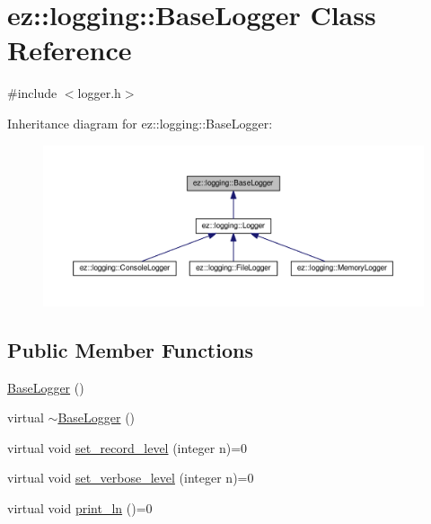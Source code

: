 \hypertarget{classez_1_1logging_1_1BaseLogger}{}\section{ez\+:\+:logging\+:\+:Base\+Logger Class Reference}
\label{classez_1_1logging_1_1BaseLogger}


{\ttfamily \#include $<$logger.\+h$>$}



Inheritance diagram for ez\+:\+:logging\+:\+:Base\+Logger\+:
\nopagebreak
\begin{figure}[H]
\begin{center}
\leavevmode
\includegraphics[width=350pt]{classez_1_1logging_1_1BaseLogger__inherit__graph}
\end{center}
\end{figure}
\subsection*{Public Member Functions}
\begin{DoxyCompactItemize}
\item 
\hyperlink{classez_1_1logging_1_1BaseLogger_ac0f5809baaacc153b6b51eb1a028127b}{Base\+Logger} ()
\item 
virtual \hyperlink{classez_1_1logging_1_1BaseLogger_a8f3ff996b9cd518dc53760ece4083813}{$\sim$\+Base\+Logger} ()
\item 
virtual void \hyperlink{classez_1_1logging_1_1BaseLogger_a508a25672c704ec73260978b7f17dd13}{set\+\_\+record\+\_\+level} (integer n)=0
\item 
virtual void \hyperlink{classez_1_1logging_1_1BaseLogger_a2b9ecfbaff4e53d15b3b8bedd53ea2f8}{set\+\_\+verbose\+\_\+level} (integer n)=0
\item 
virtual void \hyperlink{classez_1_1logging_1_1BaseLogger_a1cad8cfe8029ecd0360573b3dd4a0543}{print\+\_\+ln} ()=0
\end{DoxyCompactItemize}



